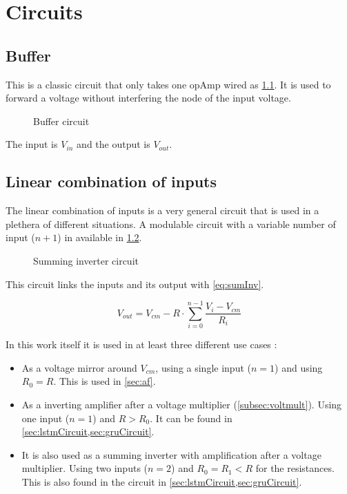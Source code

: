 \chapter{Circuits}
\label{ap:circuit}
\clearpage

\section{Buffer}\label{apsec:buffer}

This is a classic circuit that only takes one \ac{opAmp} wired as \cref{circt:buffer}. It is used to forward a voltage without interfering the node of the input voltage.

\begin{figure}[H]
  \centering
  
  \caption{Buffer circuit}
  \label{circt:buffer}
\end{figure}

The input is $V_{in}$ and the output is $V_{out}$.

\section{Linear combination of inputs}\label{apsec:sumInv}

The linear combination of inputs is a very general circuit that is used in a plethera of different situations. A modulable circuit with a variable number of input ($n+1$) in available in \cref{circt:sumInv}.

\begin{figure}[H]
  \centering
  
  \caption{Summing inverter circuit}
  \label{circt:sumInv}
\end{figure}

This circuit links the inputs and its output with \cref{eq:sumInv}.

\begin{equation}\label{eq:sumInv}
  V_{out}=V_{cm}-R\cdot\sum_{i=0}^{n-1}\frac{V_i-V_{cm}}{R_i}
\end{equation}

In this work itself it is used in at least three different use cases :

\begin{itemize}
  \item As a voltage mirror around $V_{cm}$, using a single input ($n=1$) and using $R_0=R$. This is used in \cref{sec:af}.
  \item As a inverting amplifier after a voltage multiplier (\cref{subsec:voltmult}). Using one input ($n=1$) and $R>R_0$. It can be found in \cref{sec:lstmCircuit,sec:gruCircuit}.
  \item It is also used as a summing inverter with amplification after a voltage multiplier. Using two inputs ($n=2$) and $R_0=R_1<R$ for the resistances. This is also found in the circuit in \cref{sec:lstmCircuit,sec:gruCircuit}.
\end{itemize}
